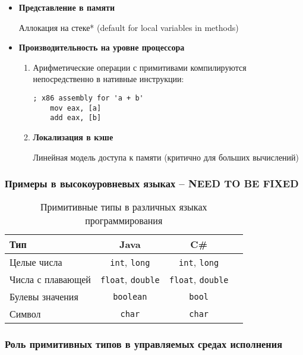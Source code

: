 \begin{itemize}
    \item \textbf{Представление в памяти}
    \begin{itemize}
        {Аллокация на стеке}* (default for local variables in methods)
    \end{itemize}
    \item \textbf{Производительность на уровне процессора}
    \begin{enumerate}
        \item

        Арифметические операции с примитивами компилируются непосредственно в нативные инструкции:

        \begin{lstlisting}[language={[x86masm]Assembler}]
    ; x86 assembly for 'a + b'
    mov eax, [a]
    add eax, [b]
        \end{lstlisting}

        \item \textbf{Локализация в кэше}

        Линейная модель доступа к памяти (критично для больших вычислений)
    \end{enumerate}
\end{itemize}

\subsubsection{Примеры в высокоуровневых языках -- NEED TO BE FIXED}

\begin{table}[h]
    \centering
    \caption{Примитивные типы в различных языках программирования}
    \begin{tabular}{lccc}
        \toprule
        \textbf{Тип} & \textbf{Java} & \textbf{C\#}  \\
        \midrule
        Целые числа & \texttt{int}, \texttt{long} & \texttt{int}, \texttt{long} \\
        Числа с плавающей & \texttt{float}, \texttt{double} & \texttt{float}, \texttt{double}  \\
        Булевы значения & \texttt{boolean} & \texttt{bool} \\
        Символ & \texttt{char} & \texttt{char} \\
        \bottomrule
    \end{tabular}
\end{table}


\subsubsection{Роль примитивных типов в управляемых средах исполнения}

